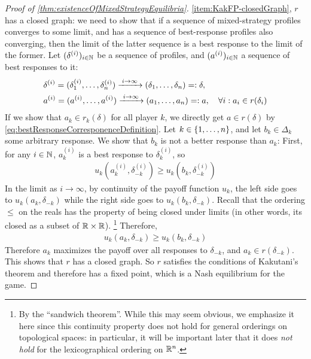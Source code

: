 \documentclass[a4paper]{scrreprt}
\begin{document}
\begin{proof}[Proof of \ref{thm:existenceOfMixedStrategyEquilibria}]
        \ref{item:KakFP-closedGraph}, $r$ has a closed graph: we need to show that if a sequence of mixed-strategy profiles converges to some limit, and has a sequence of best-response profiles also converging, then the limit of the latter sequence is a best response to the limit of the former. Let $(\delta^{(i)})_{i \in \mathbb{N}}$ be a sequence of profiles, and $(a^{(i)})_{i \in \mathbb{N}}$ a sequence of best responses to it:
        \begin{align*}
            &\delta^{(i)} = (\delta_1^{(i)}, \dots, \delta_n^{(i)}) \xrightarrow{\;i \to \infty\;} (\delta_1, \dots, \delta_n) =: \delta, \\
            &a^{(i)} = (a^{(i)}, \dots, a^{(i)}) \xrightarrow{\;i \to \infty\;} (a_1, \dots, a_n) =: a, \quad
            \forall i: a_i \in r(\delta_i)
        \end{align*}
        If we show that $a_k \in r_k(\delta)$ for all player $k$, we directly get $a \in r(\delta)$ by \eqref{eq:bestResponseCorresponenceDefinition}.
        Let $k \in \{1, \dots, n\}$, and let $b_k \in \Delta_k$ some arbitrary response. We show that $b_k$ is not a better response than $a_k$:
        First, for any $i \in \mathbb{N}$, $a^{(i)}_k$ is a best response to $\delta^{(i)}_k$, so
        \begin{gather*}
            u_k(a^{(i)}_k, \delta^{(i)}_{-k}) \geq u_k(b_k, \delta^{(i)}_{-k})
        \end{gather*}
        In the limit as $i \to \infty$, by continuity of the payoff function $u_k$, 
        the left side goes to $u_k(a_k, \delta_{-k})$ while the right side goes to $u_k(b_k, \delta_{-k})$.
        Recall that the ordering $\leq$ on the reals has the property of being closed under limits (in other words, its closed as a subset of $\mathbb{R} \times \mathbb{R}$).
        \footnote{By the “sandwich theorem”. While this may seem obvious, we emphasize it here since this continuity property does not hold for general orderings on topological spaces:
        in particular, it will be important later that it does \emph{not hold} for the lexicographical ordering on $\mathbb{R}^n$.}
        Therefore,
        \begin{gather*}
            u_k(a_k, \delta_{-k}) \geq u_k(b_k, \delta_{-k})
        \end{gather*}
        Therefore $a_k$ maximizes the payoff over all responses to $\delta_{-k}$, and $a_k \in r(\delta_{-k})$. This shows that $r$ has a closed graph.
        So $r$ satisfies the conditions of Kakutani's theorem and therefore has a fixed point, which is a Nash equilibrium for the game.
    \end{proof}
    
\end{document}
